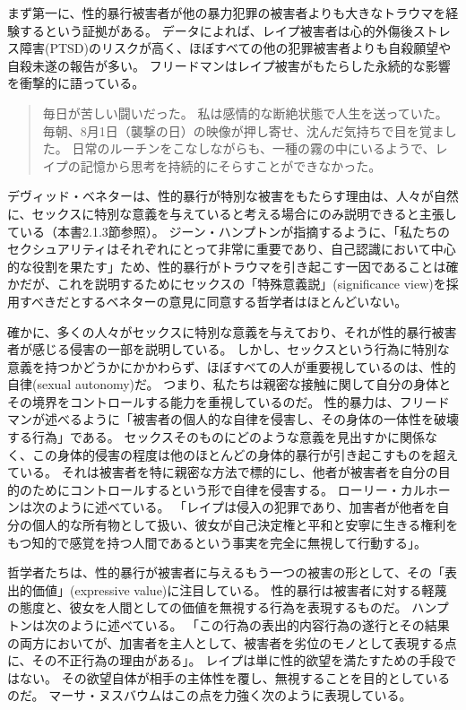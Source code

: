 \documentclass[paper=a4,book,openany]{jlreq} \usepackage{mystyle}
\begin{document}
まず第一に、性的暴行被害者が他の暴力犯罪の被害者よりも大きなトラウマを経験するという証拠がある。
データによれば、レイプ被害者は心的外傷後ストレス障害(PTSD)のリスクが高く、ほぼすべての他の犯罪被害者よりも自殺願望や自殺未遂の報告が多い\citep[p.104]{wertheimer03:_consen_sexual_relat}。
フリードマンはレイプ被害がもたらした永続的な影響を衝撃的に語っている。

\begin{quote}
毎日が苦しい闘いだった。
私は感情的な断絶状態で人生を送っていた。
毎朝、8月1日（襲撃の日）の映像が押し寄せ、沈んだ気持ちで目を覚ました。
日常のルーチンをこなしながらも、一種の霧の中にいるようで、レイプの記憶から思考を持続的にそらすことができなかった。
\citep{freedman14:_one_hour_paris}
\end{quote}

デヴィッド・ベネターは、性的暴行が特別な被害をもたらす理由は、人々が自然に、セックスに特別な意義を与えていると考える場合にのみ説明できると主張している（本書2.1.3節参照）。
ジーン・ハンプトンが指摘するように、「私たちのセクシュアリティはそれぞれにとって非常に重要であり、自己認識において中心的な役割を果たす」ため、性的暴行がトラウマを引き起こす一因であることは確かだが、これを説明するためにセックスの「特殊意義説」(significance view)を採用すべきだとするベネターの意見に同意する哲学者はほとんどいない\citep[p.151]{hampton99:_defin_wrong_and_defin_rape}。

確かに、多くの人々がセックスに特別な意義を与えており、それが性的暴行被害者が感じる侵害の一部を説明している。
しかし、セックスという行為に特別な意義を持つかどうかにかかわらず、ほぼすべての人が重要視しているのは、性的自律(sexual autonomy)だ。
つまり、私たちは親密な接触に関して自分の身体とその境界をコントロールする能力を重視しているのだ。
性的暴力は、フリードマンが述べるように「被害者の個人的な自律を侵害し、その身体の一体性を破壊する行為」である。
セックスそのものにどのような意義を見出すかに関係なく、この身体的侵害の程度は他のほとんどの身体的暴行が引き起こすものを超えている。
それは被害者を特に親密な方法で標的にし、他者が被害者を自分の目的のためにコントロールするという形で自律を侵害する。
ローリー・カルホーンは次のように述べている。
「レイプは侵入の犯罪であり、加害者が他者を自分の個人的な所有物として扱い、彼女が自己決定権と平和と安寧に生きる権利をもつ知的で感覚を持つ人間であるという事実を完全に無視して行動する」\citep[p.109]{calhoun97:_rape}。

哲学者たちは、性的暴行が被害者に与えるもう一つの被害の形として、その「表出的価値」(expressive value)に注目している。
性的暴行は被害者に対する軽蔑の態度と、彼女を人間としての価値を無視する行為を表現するものだ。
ハンプトンは次のように述べている。
「この行為の表出的内容{\DDASH}行為の遂行とその結果の両方において{\DDASH}が、加害者を主人として、被害者を劣位のモノとして表現する点に、その不正行為の理由がある」\citep[p.135]{hampton99:_defin_wrong_and_defin_rape}。
レイプは単に性的欲望を満たすための手段ではない。
その欲望自体が相手の主体性を覆し、無視することを目的としているのだ。
マーサ・ヌスバウムはこの点を力強く次のように表現している。
\end{document}
